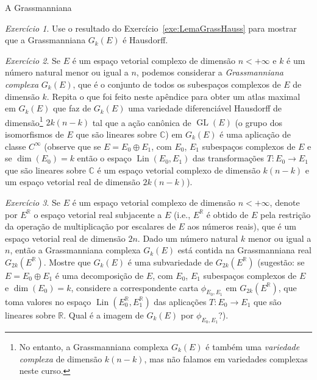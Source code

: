 \documentclass[oneside,11pt]{amsart}
\newcommand{\R}{\mathds R}
\newcommand{\C}{\mathds C}
\DeclareMathOperator{\Lin}{Lin}
\DeclareMathOperator{\Dim}{dim}
\DeclareMathOperator{\GL}{GL}
\theoremstyle{remark}\newtheorem{exercise}{Exercício}[section]
\theoremstyle{plain}\newtheorem{teo}{Teorema}[section]
\theoremstyle{plain}\newtheorem{lem}[teo]{Lema}
\theoremstyle{plain}\newtheorem{prop}[teo]{Proposição}
\theoremstyle{definition}\newtheorem{defin}[teo]{Definição}
\theoremstyle{remark}\newtheorem{rem}[teo]{Observação}
\theoremstyle{definition}\newtheorem{example}[teo]{Exemplo}
\numberwithin{equation}{section}
\begin{document}
\begin{section}{A Grassmanniana}
\begin{exercise}
Use o resultado do Exercício~\ref{exe:LemaGrassHauss} para mostrar que a Grassmanniana $G_k(E)$ é Hausdorff.
\end{exercise}

\begin{exercise}\label{exe:Grasscompl}
Se $E$ é um espaço vetorial complexo de dimensão $n<+\infty$ e $k$ é um número natural menor ou igual a $n$, podemos considerar a {\em Grassmanniana complexa\/}
$G_k(E)$, que é o conjunto de todos os subespaços complexos de $E$ de dimensão $k$. Repita o que foi feito neste apêndice para obter um atlas maximal
em $G_k(E)$ que faz de $G_k(E)$ uma variedade diferenciável Hausdorff de dimensão\footnote{%
No entanto, a Grassmanniana complexa $G_k(E)$ é também uma {\em variedade complexa\/} de dimensão $k(n-k)$,
mas não falamos em variedades complexas neste curso.} $2k(n-k)$ tal que a ação canônica de $\GL(E)$ (o grupo dos isomorfismos
de $E$ que são lineares sobre $\C$) em $G_k(E)$ é uma aplicação de classe $C^\infty$ (observe que se $E=E_0\oplus E_1$, com $E_0$, $E_1$ subespaços
complexos de $E$ e se $\Dim(E_0)=k$ então o espaço $\Lin(E_0,E_1)$ das transformações $T:E_0\to E_1$ que são lineares sobre $\C$ é um espaço vetorial
complexo de dimensão $k(n-k)$ e um espaço vetorial real de dimensão $2k(n-k)$).
\end{exercise}

\begin{exercise}
Se $E$ é um espaço vetorial complexo de dimensão $n<+\infty$, denote por $E^\R$ o espaço vetorial real subjacente a $E$ (i.e., $E^\R$ é obtido de $E$ pela
restrição da operação de multiplicação por escalares de $E$ aos números reais), que é um espaço vetorial real de dimensão $2n$. Dado um número natural $k$
menor ou igual a $n$, então a Grassmanniana complexa $G_k(E)$ está contida na Grassmanniana real $G_{2k}(E^\R)$. Mostre que
$G_k(E)$ é uma subvariedade de $G_{2k}(E^\R)$ (sugestão: se $E=E_0\oplus E_1$ é uma decomposição de $E$, com $E_0$, $E_1$ subespaços complexos
de $E$ e $\Dim(E_0)=k$, considere a correspondente carta $\phi_{E_0,E_1}$ em $G_{2k}(E^\R)$, que toma valores no espaço $\Lin(E_0^\R,E_1^\R)$ das aplicações
$T:E_0\to E_1$ que são lineares sobre $\R$. Qual é a imagem de $G_k(E)$ por $\phi_{E_0,E_1}$?).
\end{exercise}

\end{section}
\end{document}
